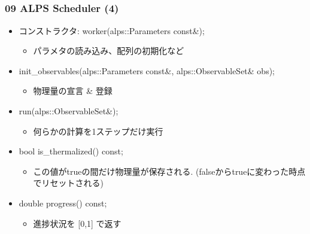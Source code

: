 \subsection*{\redm\whitem\greenb}
\begin{frame}[fragile]
  \frametitle{09 ALPS Scheduler (4)}
  \begin{itemize}
    \item コンストラクタ: worker(alps::Parameters const\&);
      \begin{itemize}
        \item パラメタの読み込み、配列の初期化など
      \end{itemize}
    \item init\_observables(alps::Parameters const\&, alps::ObservableSet\& obs);
      \begin{itemize}
        \item 物理量の宣言 \& 登録
      \end{itemize}
    \item run(alps::ObservableSet\&);
      \begin{itemize}
        \item 何らかの計算を1ステップだけ実行
      \end{itemize}
    \item bool is\_thermalized() const;
      \begin{itemize}
        \item この値がtrueの間だけ物理量が保存される. (falseからtrueに変わった時点でリセットされる)
      \end{itemize}
    \item double progress() const;
      \begin{itemize}
        \item 進捗状況を [0,1] で返す
      \end{itemize}
  \end{itemize}
\end{frame}

